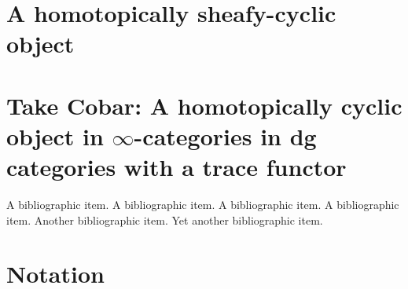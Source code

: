 \documentclass[12pt]{nuthesis}
\theoremstyle{definition}
\theoremstyle{remark}
\theoremstyle{example}
\begin{document}
\chapter{A homotopically sheafy-cyclic object}
	
	
	

\chapter{Take Cobar: A homotopically cyclic object in $\infty$-categories in dg categories
with a trace functor}



%
\begin{singlespace}
\clearpage{} %
\begin{thebibliography}{xxx}

 A bibliographic item.  A bibliographic item.  A
bibliographic item.  A bibliographic item.
 Another bibliographic item.  
 Yet another bibliographic item.  
\end{thebibliography}
\end{singlespace}

% 



\appendix		%




\chapter{Notation}	%
	
\end{document}
